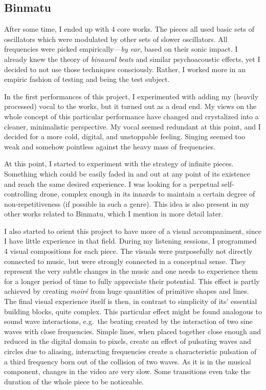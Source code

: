 \documentclass[12pt,a4paper,oneside]{report}
\begin{document}
\subsection{Binmatu}

After some time, I ended up with 4 core works. The pieces all used basic sets of oscillators which were modulated by other sets of slower oscillators. All frequencies were picked empirically---\emph{by ear}, based on their sonic impact. I already knew the theory of \emph{binaural beats} and similar psychoacoustic effects, yet I decided to not use those techniques consciously. Rather, I worked more in an empiric fashion of testing and being the test subject.

In the first performances of this project, I experimented with adding my (heavily processed) vocal to the works, but it turned out as a dead end. My views on the whole concept of this particular performance have changed and crystalized into a cleaner, minimalistic perspective. My vocal seemed redundant at this point, and I decided for a more cold, digital, and unstoppable feeling. Singing seemed too weak and somehow pointless against the heavy mass of frequencies. 

At this point, I started to experiment with the strategy of infinite pieces. Something which could be easily faded in and out at any point of its existence and reach the same desired experience. I was looking for a perpetual self-controlling drone, complex enough in its innards to maintain a certain degree of non-repetitiveness (if possible in such a genre). This idea is also present in my other works related to Binmatu, which I mention in more detail later. 

I also started to orient this project to have more of a visual accompaniment, since I have little experience in that field. During my listening sessions, I programmed 4 visual compositions for each piece. The visuals were purposefully not directly connected to music, but were strongly connected in a conceptual sense. They represent the very subtle changes in the music and one needs to experience them for a longer period of time to fully appreciate their potential. This effect is partly achieved by creating \emph{moiré} from huge quantities of primitive shapes and lines. The final visual experience itself is then, in contrast to simplicity of its' essential building blocks, quite complex. This particular effect might be found analogous to sound wave interactions, e.g.\ the beating created by the interaction of two sine waves with close frequencies. Simple lines, when placed together close enough and reduced in the digital domain to pixels, create an effect of pulsating waves and circles due to aliasing, interacting frequencies create a characteristic pulsation of a third frequency born out of the collision of two waves. As it is in the musical component, changes in the video are very slow. Some transitions even take the duration of the whole piece to be noticeable.
\end{document}

